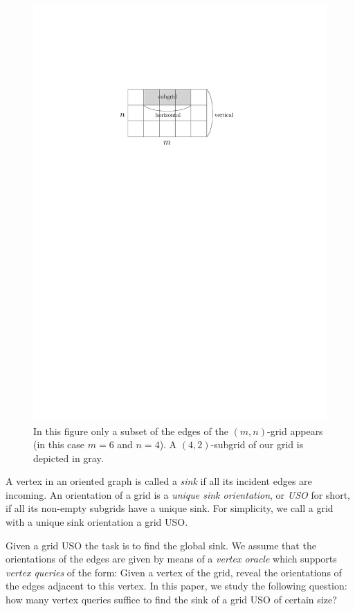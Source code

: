 \documentclass[a4paper,10pt]{article}
\begin{document}
  \begin{figure}[htbp] 
  	\centering
  	\includegraphics[scale=0.7]{examplegrid_fig.pdf}
  	\caption{In this figure only a subset of the edges of the $(m,n)$-grid appears (in this case $m=6$ and $n=4$). A $(4,2)$-subgrid of our grid is depicted in gray.} 
  	\label{fig:examplegrid}
  \end{figure}

A vertex in an oriented graph is called a \emph{sink} if all its incident edges are incoming.
An orientation of a grid is a \emph{unique sink orientation}, or \emph{USO}
for short, if all its non-empty subgrids have a unique sink. For simplicity, we call a grid with a unique sink orientation a grid USO.

Given a grid USO the task is to find the global sink. 
We assume that the orientations of the edges are given by means of a \emph{vertex oracle} which supports \emph{vertex queries} of the form: Given a vertex of the grid, reveal the orientations of the edges adjacent to this vertex.
In this paper, we study the following question: how many vertex queries suffice to find the sink of a grid USO of certain size?
\end{document}

